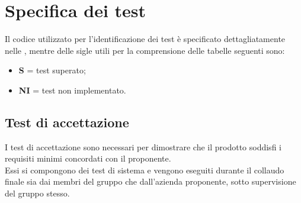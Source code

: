 \section{Specifica dei test}\label{section:specifica_test}
Il codice utilizzato per l'identificazione dei test è specificato dettagliatamente nelle \docNameVersionNdP{}, mentre delle sigle utili per la comprensione delle tabelle seguenti sono:
\begin{itemize}
  \item \textbf{S} = test superato;
  \item \textbf{NI} = test non implementato.
\end{itemize}

\subsection{Test di accettazione}\label{subsection:test_accettazione}
I test di accettazione sono necessari per dimostrare che il prodotto soddisfi i requisiti minimi concordati con il proponente. \\
Essi si compongono dei test di sistema e vengono eseguiti durante il collaudo finale sia dai membri del
gruppo che dall'azienda proponente, sotto supervisione del gruppo stesso.

